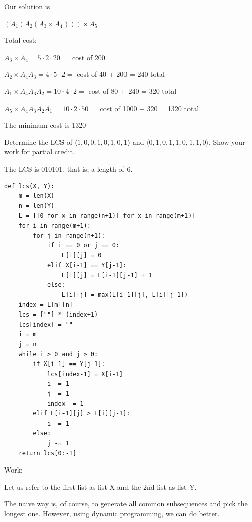 \documentclass[addpoints,11pt]{exam}
\begin{document}
\begin{questions}
\begin{solutionorbox}
Our solution is 

$(A_1(A_2(A_3 \times A_4))) \times A_5$

Total cost: 

$A_3 \times A_4 = 5 \cdot 2 \cdot 20 = $ cost of 200

$A_2 \times A_4 A_3 = 4 \cdot 5 \cdot 2 = $ cost of 40 + 200 = 240 total 

$A_1 \times A_4 A_3 A_2 = 10 \cdot 4 \cdot 2 = $ cost of 80 + 240 = 320 total 

$A_5 \times A_4 A_3 A_2 A_1 = 10 \cdot 2 \cdot 50 = $ cost of 1000 + 320 = 1320 total 

The minimum cost is 1320

\end{solutionorbox}

\ifprintanswers
\newpage
\else
\bigskip
\fi


\question[15]
Determine the LCS of $\langle 1, 0, 0, 1, 0, 1, 0, 1 \rangle$ and $\langle 0, 1, 0, 1, 1, 0, 1, 1, 0 \rangle$.  Show your work for partial credit.

\begin{solutionorbox}

The LCS is 010101, that is, a length of 6. 


\begin{verbatim}
def lcs(X, Y):
    m = len(X)
    n = len(Y)
    L = [[0 for x in range(n+1)] for x in range(m+1)]
    for i in range(m+1):
        for j in range(n+1):
            if i == 0 or j == 0:
                L[i][j] = 0
            elif X[i-1] == Y[j-1]:
                L[i][j] = L[i-1][j-1] + 1
            else:
                L[i][j] = max(L[i-1][j], L[i][j-1])
    index = L[m][n]
    lcs = [""] * (index+1)
    lcs[index] = ""
    i = m
    j = n
    while i > 0 and j > 0:
        if X[i-1] == Y[j-1]:
            lcs[index-1] = X[i-1]
            i -= 1
            j -= 1
            index -= 1
        elif L[i-1][j] > L[i][j-1]:
            i -= 1
        else:
            j -= 1
    return lcs[0:-1]
\end{verbatim}

Work: 

Let us refer to the first list as list X and the 2nd list as list Y. 

The naive way is, of course, to generate all common subsequences and pick the longest one. However, using dynamic programming, we can do better. 


\end{solutionorbox}
\end{questions}
\end{document}
